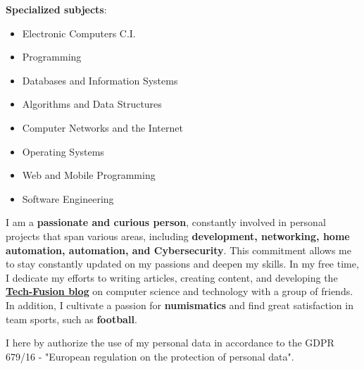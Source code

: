 

\textbf{Specialized subjects}: %

\begin{itemize}
    \item Electronic Computers C.I.
    \item Programming
    \item Databases and Information Systems
    \item Algorithms and Data Structures
    \item Computer Networks and the Internet
    \item Operating Systems
    \item Web and Mobile Programming
    \item Software Engineering
\end{itemize}





I am a \textbf{passionate and curious person}, constantly involved in personal projects that span various areas, including \textbf{development, networking, home automation, automation, and Cybersecurity}. This commitment allows me to stay constantly updated on my passions and deepen my skills.
In my free time, I dedicate my efforts to writing articles, creating content, and developing the \href{https://tech-fusion.it/}{\textbf{Tech-Fusion blog}} on computer science and technology with a group of friends. In addition, I cultivate a passion for \textbf{numismatics} and find great satisfaction in team sports, such as \textbf{football}.


\divider

\footnotesize{I here by authorize the use of my personal data in accordance to the GDPR 679/16 - "European regulation on the protection of personal data".}
